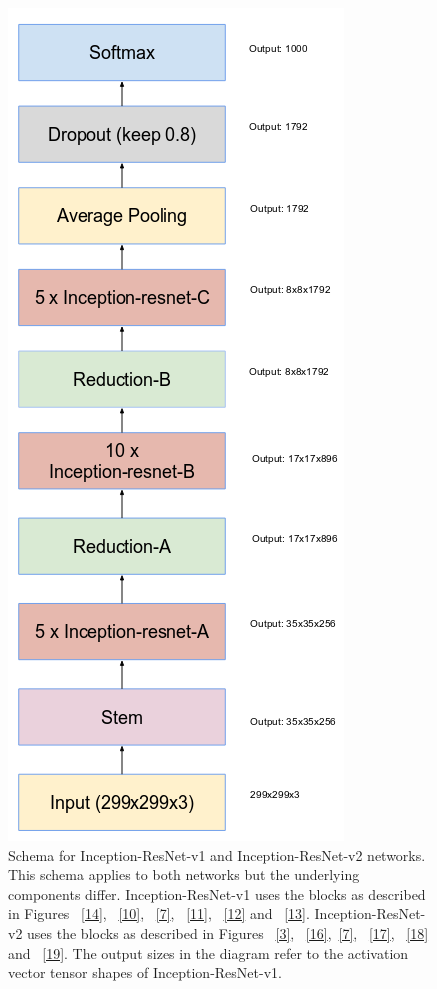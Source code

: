\documentclass[a4paper,12pt, twoside]{NITKReport}
\begin{document}
\begin{figure}
\begin{minipage}[b]{0.4\textwidth}
    \includegraphics[width=\textwidth]{figure15.png}
    \caption{Schema   for   Inception-ResNet-v1   and   Inception-ResNet-v2 networks.  This schema applies to both networks but the underlying components differ.  Inception-ResNet-v1 uses the blocks as described in Figures ~\ref{14}, ~\ref{10}, ~\ref{7}, ~\ref{11}, ~\ref{12} and ~\ref{13}. Inception-ResNet-v2 uses the blocks as described in Figures ~\ref{3}, ~\ref{16},~\ref{7}, ~\ref{17}, ~\ref{18} and  ~\ref{19}. The output sizes in the diagram refer to the  activation vector tensor shapes of Inception-ResNet-v1.}
    \label{15}
  \end{minipage}
\end{figure}
\end{document}
